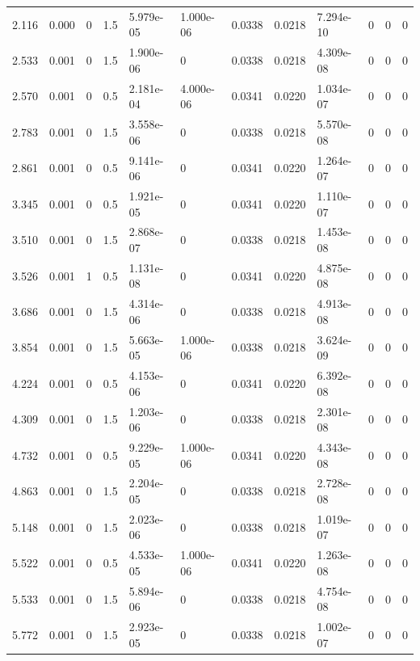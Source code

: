 \documentclass[preview]{standalone}
\begin{document}
{{\begin{tabular}{L{1.2cm}C{1.2cm} C{0.3cm}C{0.5cm} C{1.4cm}C{1.4cm} C{1.4cm}C{1.4cm} C{1.6cm}C{1.6cm} C{1.6cm}C{1.6cm}}
  2.116  &  0.000  & 0     & 1.5 &  5.979e-05  & 1.000e-06  &  0.0338&   0.0218& 7.294e-10 & 0   &  0 & 0  \\ 
  2.533  &  0.001  & 0     & 1.5 &  1.900e-06  & 0  &  0.0338&   0.0218& 4.309e-08 & 0   &  0 & 0  \\ 
  2.570  &  0.001  & 0     & 0.5 &  2.181e-04  & 4.000e-06  &  0.0341&   0.0220& 1.034e-07 & 0   &  0 & 0  \\ 
  2.783  &  0.001  & 0     & 1.5 &  3.558e-06  & 0  &  0.0338&   0.0218& 5.570e-08 & 0   &  0 & 0  \\ 
  2.861  &  0.001  & 0     & 0.5 &  9.141e-06  & 0  &  0.0341&   0.0220& 1.264e-07 & 0   &  0 & 0  \\ 
  3.345  &  0.001  & 0     & 0.5 &  1.921e-05  & 0  &  0.0341&   0.0220& 1.110e-07 & 0   &  0 & 0  \\ 
  3.510  &  0.001  & 0     & 1.5 &  2.868e-07  & 0  &  0.0338&   0.0218& 1.453e-08 & 0   &  0 & 0  \\ 
  3.526  &  0.001  & 1     & 0.5 &  1.131e-08  & 0  &  0.0341&   0.0220& 4.875e-08 & 0   &  0 & 0  \\ 
  3.686  &  0.001  & 0     & 1.5 &  4.314e-06  & 0  &  0.0338&   0.0218& 4.913e-08 & 0   &  0 & 0  \\ 
  3.854  &  0.001  & 0     & 1.5 &  5.663e-05  & 1.000e-06  &  0.0338&   0.0218& 3.624e-09 & 0   &  0 & 0  \\ 
  4.224  &  0.001  & 0     & 0.5 &  4.153e-06  & 0  &  0.0341&   0.0220& 6.392e-08 & 0   &  0 & 0  \\ 
  4.309  &  0.001  & 0     & 1.5 &  1.203e-06  & 0  &  0.0338&   0.0218& 2.301e-08 & 0   &  0 & 0  \\ 
  4.732  &  0.001  & 0     & 0.5 &  9.229e-05  & 1.000e-06  &  0.0341&   0.0220& 4.343e-08 & 0   &  0 & 0  \\ 
  4.863  &  0.001  & 0     & 1.5 &  2.204e-05  & 0  &  0.0338&   0.0218& 2.728e-08 & 0   &  0 & 0  \\ 
  5.148  &  0.001  & 0     & 1.5 &  2.023e-06  & 0  &  0.0338&   0.0218& 1.019e-07 & 0   &  0 & 0  \\ 
  5.522  &  0.001  & 0     & 0.5 &  4.533e-05  & 1.000e-06  &  0.0341&   0.0220& 1.263e-08 & 0   &  0 & 0  \\ 
  5.533  &  0.001  & 0     & 1.5 &  5.894e-06  & 0  &  0.0338&   0.0218& 4.754e-08 & 0   &  0 & 0  \\ 
  5.772  &  0.001  & 0     & 1.5 &  2.923e-05  & 0  &  0.0338&   0.0218& 1.002e-07 & 0   &  0 & 0  \\ 

\end{tabular}}}
\end{document}
